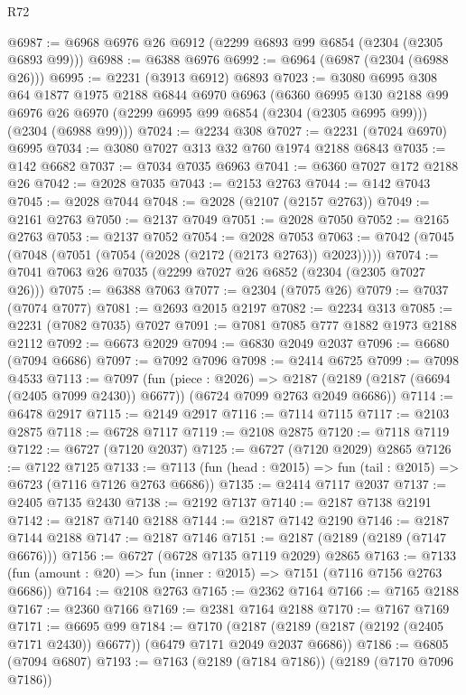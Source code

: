 \begin{lexlean}{R72}
\begin{coremodule}
@6987 := @6968 @6976 @26 @6912 (@2299 @6893 @99 @6854 (@2304 (@2305 @6893 @99)))
@6988 := @6388 @6976
@6992 := @6964 (@6987 (@2304 (@6988 @26)))
@6995 := @2231 (@3913 @6912) @6893
@7023 := @3080
    @6995
    @308
    @64
    @1877
    @1975
    @2188
    @6844
    @6970
    @6963
    (@6360
      @6995
      @130
      @2188
      @99
      @6976
      @26
      @6970
      (@2299 @6995 @99 @6854 (@2304 (@2305 @6995 @99)))
      (@2304 (@6988 @99)))
@7024 := @2234 @308
@7027 := @2231 (@7024 @6970) @6995
@7034 := @3080 @7027 @313 @32 @760 @1974 @2188 @6843
@7035 := @142 @6682
@7037 := @7034 @7035 @6963
@7041 := @6360 @7027 @172 @2188 @26
@7042 := @2028 @7035
@7043 := @2153 @2763
@7044 := @142 @7043
@7045 := @2028 @7044
@7048 := @2028 (@2107 (@2157 @2763))
@7049 := @2161 @2763
@7050 := @2137 @7049
@7051 := @2028 @7050
@7052 := @2165 @2763
@7053 := @2137 @7052
@7054 := @2028 @7053
@7063 := @7042 (@7045 (@7048 (@7051 (@7054 (@2028 (@2172 (@2173 @2763)) @2023)))))
@7074 := @7041 @7063 @26 @7035 (@2299 @7027 @26 @6852 (@2304 (@2305 @7027 @26)))
@7075 := @6388 @7063
@7077 := @2304 (@7075 @26)
@7079 := @7037 (@7074 @7077)
@7081 := @2693 @2015 @2197
@7082 := @2234 @313
@7085 := @2231 (@7082 @7035) @7027
@7091 := @7081 @7085 @777 @1882 @1973 @2188 @2112
@7092 := @6673 @2029
@7094 := @6830 @2049 @2037
@7096 := @6680 (@7094 @6686)
@7097 := @7092 @7096
@7098 := @2414 @6725
@7099 := @7098 @4533
@7113 := @7097
    (fun (piece : @2026) =>
    @2187 (@2189 (@2187 (@6694 (@2405 @7099 @2430)) @6677)) (@6724 @7099 @2763 @2049 @6686))
@7114 := @6478 @2917
@7115 := @2149 @2917
@7116 := @7114 @7115
@7117 := @2103 @2875
@7118 := @6728 @7117
@7119 := @2108 @2875
@7120 := @7118 @7119
@7122 := @6727 (@7120 @2037)
@7125 := @6727 (@7120 @2029) @2865
@7126 := @7122 @7125
@7133 := @7113 (fun (head : @2015) => fun (tail : @2015) => @6723 (@7116 @7126 @2763 @6686))
@7135 := @2414 @7117 @2037
@7137 := @2405 @7135 @2430
@7138 := @2192 @7137
@7140 := @2187 @7138 @2191
@7142 := @2187 @7140 @2188
@7144 := @2187 @7142 @2190
@7146 := @2187 @7144 @2188
@7147 := @2187 @7146
@7151 := @2187 (@2189 (@2189 (@7147 @6676)))
@7156 := @6727 (@6728 @7135 @7119 @2029) @2865
@7163 := @7133 (fun (amount : @20) => fun (inner : @2015) => @7151 (@7116 @7156 @2763 @6686))
@7164 := @2108 @2763
@7165 := @2362 @7164
@7166 := @7165 @2188
@7167 := @2360 @7166
@7169 := @2381 @7164 @2188
@7170 := @7167 @7169
@7171 := @6695 @99
@7184 := @7170
    (@2187 (@2189 (@2187 (@2192 (@2405 @7171 @2430)) @6677)) (@6479 @7171 @2049 @2037 @6686))
@7186 := @6805 (@7094 @6807)
@7193 := @7163 (@2189 (@7184 @7186)) (@2189 (@7170 @7096 @7186))

\end{coremodule}
\end{lexlean}
